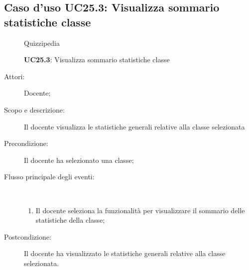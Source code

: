 \subsection{Caso d'uso UC25.3: Visualizza sommario statistiche classe}
	\begin{figure}[H]
		\centering
		\begin{resizedtikzpicture}{\textwidth}
		\begin{umlsystem}[x=0, fill=lightgray!20]{Quizzipedia}
		\end{umlsystem}
		\end{resizedtikzpicture}
		\caption{\textbf{UC25.3}: Visualizza sommario statistiche classe}
		\label{UC25.3}
	\end{figure}
\begin{description}
\item[Attori:] Docente;
\item[Scopo e descrizione:] Il docente visualizza le statistiche generali relative alla classe selezionata
      \item[Precondizione:] Il docente ha selezionato una classe;

        \item[Flusso principale degli eventi:] \ 
 \begin{enumerate}
          \item Il docente seleziona la funzionalità per visualizzare il sommario delle statistiche della classe;

      \end{enumerate}
    \item[Postcondizione:] Il docente ha visualizzato le statistiche generali relative alla classe selezionata.
  \end{description}
\hypertarget{UC25.4}{}
